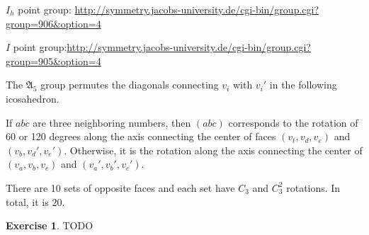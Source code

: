 \documentclass[12pt, letterpaper]{article}
\newcommand{\red}[1]{{\color{red} #1}}
\theoremstyle{definition}
\theoremstyle{remark}
\theoremstyle{definition}
\newtheorem{exe}{Exercise}[section]
\theoremstyle{plain}
\numberwithin{equation}{section}
\begin{document}
	$I_h$ point group: \url{http://symmetry.jacobs-university.de/cgi-bin/group.cgi?group=906&option=4}
	
	$I$ point group:\url{http://symmetry.jacobs-university.de/cgi-bin/group.cgi?group=905&option=4}
	
	The $\mathfrak{A}_5$ group permutes the diagonals connecting $v_i$ with $v_i'$ in the following icosahedron.
	\begin{center}
	\end{center}

	If $abc$ are three neighboring numbers,
	then $(abc)$ corresponds to the rotation of 60 or 120 degrees along the axis connecting the center of
	faces $(v_t, v_d, v_e)$ and $(v_b,v_d',v_e')$.
	Otherwise, it is the rotation along the axis connecting the center of $(v_a,v_b,v_c)$ and $(v_a',v_b',v_c')$.
	
	There are 10 sets of opposite faces and each set have $C_3$ and $C_3^2$ rotations. In total, it is 20.
	
	\begin{exe}
		\red{TODO}
	\end{exe}
\end{document}
